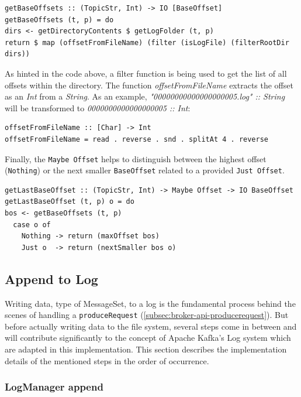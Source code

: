\begin{lstlisting}
getBaseOffsets :: (TopicStr, Int) -> IO [BaseOffset]
getBaseOffsets (t, p) = do
dirs <- getDirectoryContents $ getLogFolder (t, p)
return $ map (offsetFromFileName) (filter (isLogFile) (filterRootDir dirs))
\end{lstlisting}

As hinted in the code above, a filter function is being used to get the list of
all offsets within the directory. The function \textit{offsetFromFileName}
extracts the offset as an \textit{Int} from a \textit{String}. As an example,
\textit{"00000000000000000005.log" :: String } will be transformed to
\textit{0000000000000000005 :: Int}:

\begin{lstlisting}
offsetFromFileName :: [Char] -> Int
offsetFromFileName = read . reverse . snd . splitAt 4 . reverse
\end{lstlisting}

Finally, the \lstinline{Maybe Offset} helps to distinguish between the highest offset
(\lstinline{Nothing}) or the next smaller \lstinline{BaseOffset} related to a provided
\lstinline{Just Offset}. 

\begin{lstlisting}
getLastBaseOffset :: (TopicStr, Int) -> Maybe Offset -> IO BaseOffset
getLastBaseOffset (t, p) o = do
bos <- getBaseOffsets (t, p)
  case o of
    Nothing -> return (maxOffset bos)
    Just o  -> return (nextSmaller bos o)
\end{lstlisting}

\subsection{Append to Log}

Writing data, type of MessageSet, to a log is the fundamental process behind the
scenes of handling a \lstinline{produceRequest}
(\ref{subsec:broker-api-producerequest}). But before actually writing data
to the file system, several steps come in between and will contribute
significantly to the concept of Apache Kafka's Log system which are adapted in
this implementation. This section describes the implementation details of the
mentioned steps in the order of occurrence.

\subsubsection{LogManager append}


